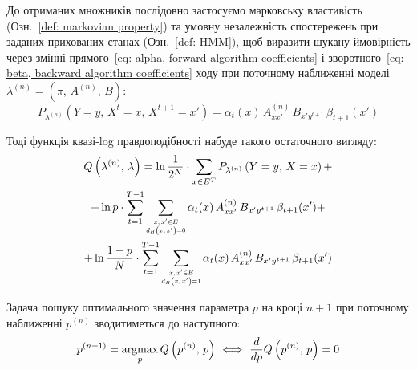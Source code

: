До отриманих множників послідовно застосуємо марковську властивість (Озн.~\ref{def: markovian property}) та умовну незалежність спостережень при заданих прихованих станах (Озн.~\ref*{def: HMM}), щоб виразити шукану ймовірність через змінні прямого~\eqref{eq: alpha, forward algorithm coefficients} і зворотного~\eqref{eq: beta, backward algorithm coefficients} ходу при поточному наближенні моделі $\lambda^{(n)}=(\pi,\,A^{(n)},\,B):$
\begin{equation*}
    P_{\lambda^{(n)}} \left( Y=y,\, X^t=x,\, X^{t+1}=x' \right) = \alpha_t(x)\,A^{(n)}_{xx'}\,B_{x'y^{t+1}}\,\beta_{t+1}(x')
\end{equation*}

Тоді функція квазі-log правдоподібності набуде такого остаточного вигляду:
\begin{multline*}
    Q\left( \lambda^{(n)},\,\lambda \right) = \ln\frac{1}{2^N} \cdot \sum\limits_{x \in E^T} P_{\lambda^{(n)}} \left( Y=y,\, X=x  \right) + \\
    + \ln p \cdot \sum\limits_{t=1}^{T-1} \sum\limits_{\scaleq[0.8]{\substack{x,\,x' \in E \\ d_H\left( x,\,x' \right) = 0}}} \alpha_t(x)\,A^{(n)}_{xx'}\,B_{x'y^{t+1}}\,\beta_{t+1}(x') + \\
    + \ln\frac{1-p}{N} \cdot \sum\limits_{t=1}^{T-1} \sum\limits_{\scaleq[0.8]{\substack{x,\,x' \in E \\ d_H\left( x,\,x' \right) = 1}}} \alpha_t(x)\,A^{(n)}_{xx'}\,B_{x'y^{t+1}}\,\beta_{t+1}(x')
\end{multline*}

Задача пошуку оптимального значення параметра $p$ на кроці $n+1$ при поточному наближенні $p^{(n)}$ зводитиметься до наступного:
\begin{equation*}
    p^{(n+1)} = \argmax\limits_{p} Q\left( p^{(n)},\,p \right)\ \Longleftrightarrow\ \frac{d}{dp} Q\left( p^{(n)},\,p \right) = 0
\end{equation*}

